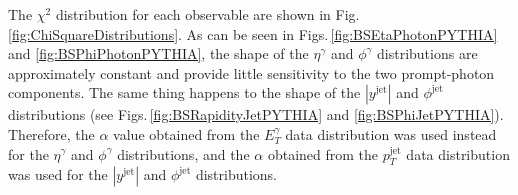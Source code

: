 \documentclass[12pt, twoside]{article}
\numberwithin{equation}{section}
\numberwithin{figure}{section}
\begin{document}
The $\chi^{2}$ distribution for each observable are shown in Fig.\,\ref{fig:ChiSquareDistributions}. As can be seen in Figs.\,\ref{fig:BSEtaPhotonPYTHIA} and \ref{fig:BSPhiPhotonPYTHIA}, the shape of the $\eta^{\gamma}$ and $\phi^{\gamma}$ distributions are approximately constant and provide little sensitivity to the two prompt-photon components. The same thing happens to the shape of the $\left| y^{\text{jet}} \right|$ and $\phi^{\text{jet}}$ distributions (see Figs.\,\ref{fig:BSRapidityJetPYTHIA} and \ref{fig:BSPhiJetPYTHIA}). Therefore, the $\alpha$ value obtained from the $E^{\gamma}_{T}$ data distribution was used instead for the $\eta^{\gamma}$ and $\phi^{\gamma}$ distributions, and the $\alpha$ obtained from the $p^{\text{jet}}_{T}$ data distribution was used for the $\left| y^{\text{jet}} \right|$ and $\phi^{\text{jet}}$ distributions.
\end{document}
